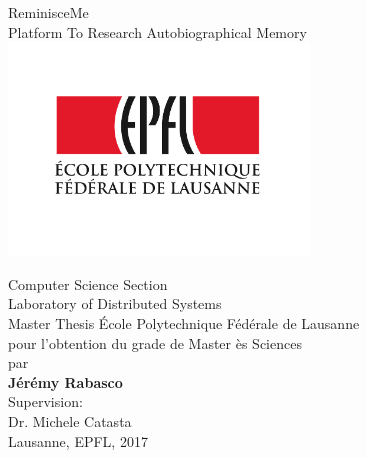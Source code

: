 \begin{titlepage}
\begin{center}
\sffamily


\null\vspace{2cm}
{\huge ReminisceMe \\[12pt] Platform To Research Autobiographical Memory} \\[24pt]
\includegraphics[width=8cm]{images/epfl} 
    
\vfill


Computer Science Section\\
Laboratory of Distributed Systems\\
Master Thesis
\'Ecole Polytechnique F\'ed\'erale de Lausanne\\[6pt]
pour l'obtention du grade de Master \`es Sciences\\
par\\ [4pt]
\vfill
\textbf{J\'er\'emy Rabasco}\\[9pt]
%
\vfill
\small
Supervision:\\
%
Dr. Michele Catasta\\
%
\vfill
Lausanne, EPFL, 2017

\end{center}
\end{titlepage}


